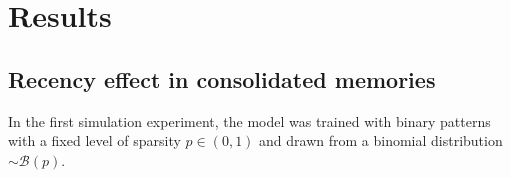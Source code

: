 \section{Results}

\subsection{Recency effect in consolidated memories}

In the first simulation experiment, the model was trained with binary patterns with a fixed level of sparsity $p\in(0,1)$ and drawn from a binomial distribution $\sim\mathcal{B}(p)$.


